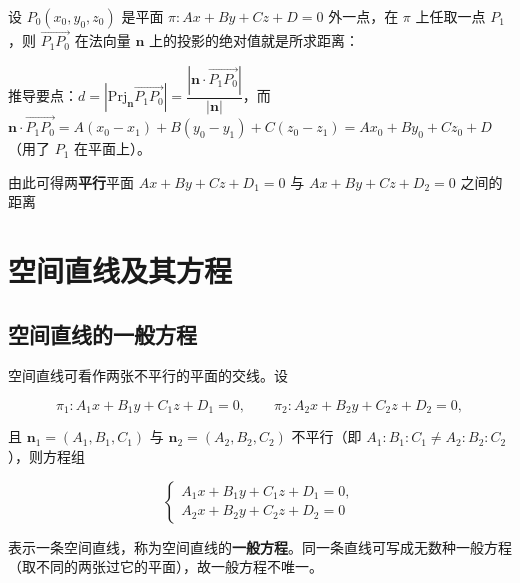 设 $P_0(x_0,y_0,z_0)$ 是平面 $\pi:Ax+By+Cz+D=0$ 外一点，在 $\pi$ 上任取一点 $P_1$，则 $\overrightarrow{P_1P_0}$ 在法向量 $\boldsymbol{n}$ 上的投影的绝对值就是所求距离：


推导要点：$d=\left|\mathrm{Prj}_{\boldsymbol{n}}\overrightarrow{P_1P_0}\right|=\dfrac{|\boldsymbol{n}\cdot\overrightarrow{P_1P_0}|}{|\boldsymbol{n}|}$，而 $\boldsymbol{n}\cdot\overrightarrow{P_1P_0}=A(x_0-x_1)+B(y_0-y_1)+C(z_0-z_1)=Ax_0+By_0+Cz_0+D$（用了 $P_1$ 在平面上）。

由此可得两\textbf{平行}平面 $Ax+By+Cz+D_1=0$ 与 $Ax+By+Cz+D_2=0$ 之间的距离



\section{空间直线及其方程}

\subsection{空间直线的一般方程}

空间直线可看作两张不平行的平面的交线。设

\[
\pi_1:A_1x+B_1y+C_1z+D_1=0,\qquad
\pi_2:A_2x+B_2y+C_2z+D_2=0,
\]

且 $\boldsymbol{n}_1=(A_1,B_1,C_1)$ 与 $\boldsymbol{n}_2=(A_2,B_2,C_2)$ 不平行（即 $A_1:B_1:C_1\neq A_2:B_2:C_2$），则方程组

\[
\begin{cases}
A_1x+B_1y+C_1z+D_1=0,\\
A_2x+B_2y+C_2z+D_2=0
\end{cases}
\]

表示一条空间直线，称为空间直线的\textbf{一般方程}。同一条直线可写成无数种一般方程（取不同的两张过它的平面），故一般方程不唯一。

